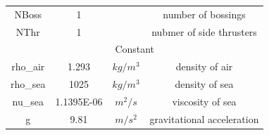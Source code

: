 \begin{center}
\begin{longtable}{cccc}
            NBoss      & 1          &                         & number of bossings                                            \\
            NThr       & 1          &                         & nubmer of side   thrusters                                    \\
            \cline{1-4}
            \multicolumn{4}{c}{Constant}                                                                                      \\
            \cline{1-4}
            rho\_air   & 1.293      & $kg/m^3$ & density of air                                                \\
            rho\_sea   & 1025       & $kg/m^3$ & density of sea                                                \\
            nu\_sea    & 1.1395E-06 & $m^2/s$  & viscosity of sea                                              \\
            g          & 9.81       & $m/s^2$  & gravitational   acceleration                                 
    \end{longtable}
\end{center}
